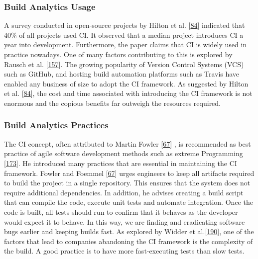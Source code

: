 \documentclass[]{book}
\begin{document}
\subsubsection{Build Analytics Usage}\label{build-analytics-usage}

A survey conducted in open-source projects by Hilton et al.
{[}\protect\hyperlink{ref-hilton2016usage}{84}{]} indicated that 40\% of
all projects used CI. It observed that a median project introduces CI a
year into development. Furthermore, the paper claims that CI is widely
used in practice nowadays. One of many factors contributing to this is
explored by Rausch et al.
{[}\protect\hyperlink{ref-rausch2017empirical}{157}{]}. The growing
popularity of Version Control Systems (VCS) such as GitHub, and hosting
build automation platforms such as Travis have enabled any business of
size to adopt the CI framework. As suggested by Hilton et al.
{[}\protect\hyperlink{ref-hilton2016usage}{84}{]}, the cost and time
associated with introducing the CI framework is not enormous and the
copious benefits far outweigh the resources required.

\subsubsection{Build Analytics
Practices}\label{build-analytics-practices}

The CI concept, often attributed to Martin Fowler
{[}\protect\hyperlink{ref-fowler2006continuous}{67}{]} , is recommended
as best practice of agile software development methods such as extreme
Programming {[}\protect\hyperlink{ref-stolberg2009enabling}{173}{]}. He
introduced many practices that are essential in maintaining the CI
framework. Fowler and Foemmel
{[}\protect\hyperlink{ref-fowler2006continuous}{67}{]} urges engineers
to keep all artifacts required to build the project in a single
repository. This ensures that the system does not require additional
dependencies. In addition, he advises creating a build script that can
compile the code, execute unit tests and automate integration. Once the
code is built, all tests should run to confirm that it behaves as the
developer would expect it to behave. In this way, we are finding and
eradicating software bugs earlier and keeping builds fast. As explored
by Widder et al.{[}\protect\hyperlink{ref-widder2018m}{190}{]}, one of
the factors that lead to companies abandoning the CI framework is the
complexity of the build. A good practice is to have more fast-executing
tests than slow tests.
\end{document}
